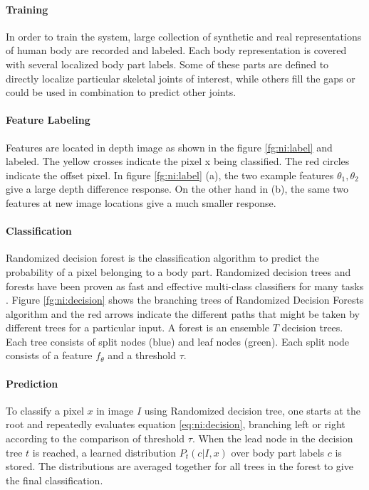 

\paragraph*{Training} In order to train the system, large collection of synthetic and real representations of human body are recorded and labeled. Each body representation is covered with several localized body part labels. Some of these parts are defined to directly localize particular skeletal joints of interest, while others fill the gaps or could be used in combination to predict other joints.

%

\paragraph*{Feature Labeling} Features are located in depth image as shown in the figure \ref{fg:ni:label} and labeled. The yellow crosses indicate the pixel x being classified. The red circles indicate the offset pixel. In figure \ref{fg:ni:label} (a), the two example features $\theta_1, \theta_2$ give a large depth difference response. On the other hand in (b), the same two features at new image locations give a much smaller response.



\paragraph*{Classification} Randomized decision forest is the classification algorithm to predict the probability of a pixel belonging to a body part. Randomized decision trees and forests have been proven as fast and effective multi-class classifiers for many tasks \cite{13}. Figure \ref{fg:ni:decision} shows the branching trees of Randomized Decision Forests algorithm and the red arrows indicate the different paths that might be taken by different trees for a particular input. A forest is an ensemble $T$ decision trees. Each tree consists of split nodes (blue) and leaf nodes (green). Each split node consists of a feature $f_\theta$ and a threshold $\tau$. 



\paragraph*{Prediction} To classify a pixel $x$ in image $I$ using Randomized decision tree, one starts at the root and repeatedly evaluates equation \ref{eq:ni:decision}, branching left or right according to the comparison of threshold {$ \tau$}. When the lead node in the decision tree $t$ is reached, a learned distribution $ P_t(c|I,x) $ over body part labels $c$ is stored. The distributions are averaged together for all trees in the forest to give the final classification.

